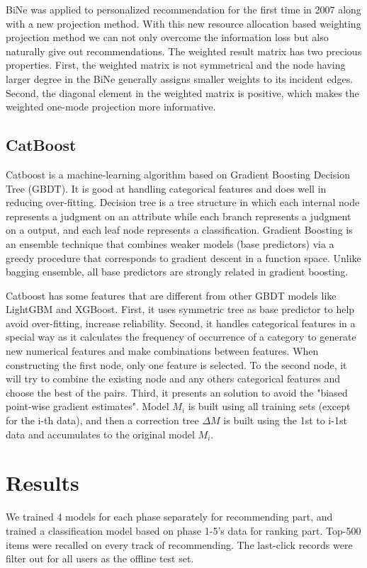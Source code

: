 \documentclass[manuscript,noacm]{acmart}
\begin{document}
BiNe was applied to personalized recommendation for the first time in 2007 along with a new projection method\cite{zhou2007bipartite}. With this new resource allocation based weighting projection method we can not only overcome the information loss but also naturally give out recommendations. The weighted result matrix has two precious properties. First, the weighted matrix is not symmetrical and the node having larger degree in the BiNe generally assigns smaller weights to its incident edges. Second, the diagonal element in the weighted matrix is positive, which makes the weighted one-mode projection more informative\cite{zhou2007bipartite}.



\subsection{CatBoost}
Catboost is a machine-learning algorithm based on Gradient Boosting Decision Tree (GBDT). It is good at handling categorical features and does well in reducing over-fitting. Decision tree is a tree structure in which each internal node represents a judgment on an attribute while each branch represents a judgment on a output, and each leaf node represents a classification. Gradient Boosting is an ensemble technique that combines weaker models (base predictors) via a greedy procedure that corresponds to gradient descent in a function space. Unlike bagging ensemble, all base predictors are strongly related in gradient boosting.

Catboost has some features that are different from other GBDT models like LightGBM and XGBoost. First, it uses symmetric tree as base predictor to help avoid over-fitting, increase reliability. Second, it handles categorical features in a special way as it calculates the frequency of occurrence of a category to generate new numerical features and make combinations between features. When constructing the first node, only one feature is selected. To the second node, it will try to combine the existing node and any others categorical features and choose the best of the pairs. Third, it presents an solution to avoid the "biased point-wise gradient estimates". Model $M_{i}$ is built using all training sets (except for the i-th data), and then a correction tree  $\Delta M$ is built using the 1st to i-1st data and accumulates to the original model $M_{i}$\cite{dorogush2018catboost:}.


\section{Results}
We trained 4 models for each phase separately for recommending part, and trained a classification model based on phase 1-5's data for ranking part. Top-500 items were recalled on every track of recommending. The last-click records were filter out for all users as the offline test set.
\end{document}
